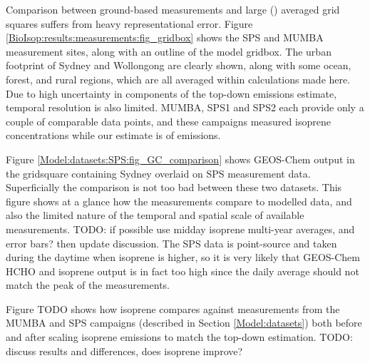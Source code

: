     Comparison between ground-based measurements and large (\lowhr) averaged grid squares suffers from heavy representational error.
    Figure \ref{BioIsop:results:measurements:fig_gridbox} shows the SPS and MUMBA measurement sites, along with an outline of the \lowhr model gridbox. 
    The urban footprint of Sydney and Wollongong are clearly shown, along with some ocean, forest, and rural regions, which are all averaged within calculations made here.
    Due to high uncertainty in components of the top-down emissions estimate, temporal resolution is also limited.
    MUMBA, SPS1 and SPS2 each provide only a couple of comparable data points, and these campaigns measured isoprene concentrations while our estimate is of emissions.
    
    
    Figure \ref{Model:datasets:SPS:fig_GC_comparison} shows GEOS-Chem output in the gridsquare containing Sydney overlaid on SPS measurement data.
    Superficially the comparison is not too bad between these two datasets.
    This figure shows at a glance how the measurements compare to modelled data, and also the limited nature of the temporal and spatial scale of available measurements.
    TODO: if possible use midday isoprene multi-year averages, and error bars? then update discussion.
    The SPS data is point-source and taken during the daytime when isoprene is higher, so it is very likely that GEOS-Chem HCHO and isoprene output is in fact too high since the daily average should not match the peak of the measurements.
    
    
    Figure TODO shows how isoprene compares against measurements from the MUMBA and SPS campaigns (described in Section \ref{Model:datasets}) both before and after scaling isoprene emissions to match the top-down estimation.
    TODO: discuss results and differences, does isoprene improve?
    
